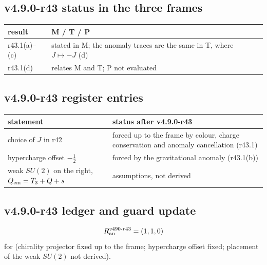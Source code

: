 \subsection*{v4.9.0-r43 status in the three frames}
\label{subsec:v490-r43-frames}

\begin{center}
\small
\begin{tabular}{@{}>{\raggedright\arraybackslash}p{}>{\raggedright\arraybackslash}p{}@{}}
\toprule
result & M / T / P\\
\midrule
r43.1(a)--(c) & stated in M; the anomaly traces are the same in T, where \(J\mapsto-J\) (d)\\
r43.1(d) & relates M and T; P not evaluated\\
\bottomrule
\end{tabular}
\end{center}

\subsection*{v4.9.0-r43 register entries}
\label{subsec:v490-r43-register}

\begin{center}
\small
\begin{tabular}{@{}>{\raggedright\arraybackslash}p{}>{\raggedright\arraybackslash}p{}@{}}
\toprule
statement & status after v4.9.0-r43\\
\midrule
choice of \(J\) in r42 & forced up to the frame by colour, charge conservation and anomaly cancellation (r43.1)\\
hypercharge offset \(-\tfrac12\) & forced by the gravitational anomaly (r43.1(b))\\
weak \(SU(2)\) on the right, \(Q_{\rm em}=T_3+Q+s\) & assumptions, not derived\\
\bottomrule
\end{tabular}
\end{center}

\subsection*{v4.9.0-r43 ledger and guard update}
\label{subsec:v490-r43-ledger-guard}

\[
R_{\rm an}^{v490\text{-}r43}=(1,1,0)
\]
for (chirality projector fixed up to the frame; hypercharge offset fixed; placement of the weak \(SU(2)\) not derived).

